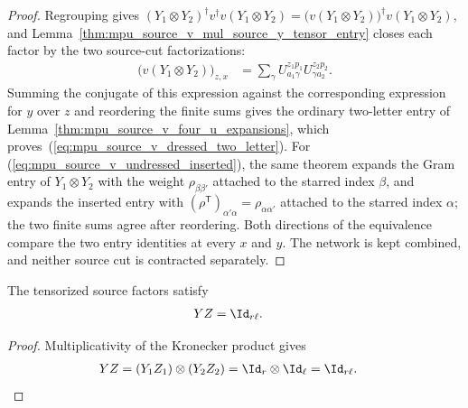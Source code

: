 \begin{proof}\leanok
    Regrouping gives
    $(Y_1\otimes Y_2)^\dagger v^\dagger v(Y_1\otimes Y_2)
        =\bigl(v(Y_1\otimes Y_2)\bigr)^\dagger v(Y_1\otimes Y_2)$, and
    Lemma~\ref{thm:mpu_source_v_mul_source_y_tensor_entry} closes each
    factor by the two source-cut factorizations:
    \begin{align}
        \bigl(v(Y_1\otimes Y_2)\bigr)_{z,x}
         & =\sum_\gamma U^{z_1p_1}_{a_1\gamma}U^{z_2p_2}_{\gamma a_2}.
    \end{align}
    Summing the conjugate of this expression against the corresponding
    expression for $y$ over $z$ and reordering the finite sums gives the
    ordinary two-letter entry of
    Lemma~\ref{thm:mpu_source_v_four_u_expansions}, which
    proves~(\ref{eq:mpu_source_v_dressed_two_letter}). For
    (\ref{eq:mpu_source_v_undressed_inserted}), the same theorem expands the
    Gram entry of $Y_1\otimes Y_2$ with the weight $\rho_{\beta\beta'}$
    attached to the starred index $\beta$, and expands the inserted entry with
    $(\rho^{\mathsf T})_{\alpha'\alpha}=\rho_{\alpha\alpha'}$ attached to the
    starred index $\alpha$; the two finite sums agree after reordering. Both
    directions of the equivalence compare the two entry identities at every
    $x$ and $y$. The network is kept combined, and neither source cut is
    contracted separately.
\end{proof}

\begin{lemma}
    \label{thm:mpu_source_yz_tensor}
    \leanok
    The tensorized source factors satisfy
    \begin{align}
        YZ & =\Id_{r\ell}.
    \end{align}
\end{lemma}

\begin{proof}
    \leanok
    Multiplicativity of the Kronecker product gives
    \begin{align}
        YZ & =(Y_1Z_1)\otimes(Y_2Z_2)
        =\Id_r\otimes\Id_\ell=\Id_{r\ell}.
    \end{align}
\end{proof}


